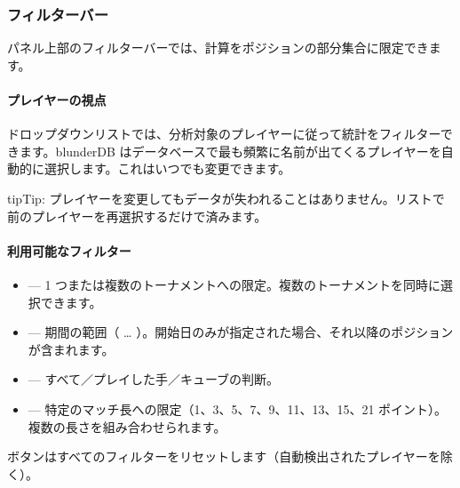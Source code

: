 \documentclass[letterpaper,10pt,dvipdfmx]{sphinxmanual}
\begin{document}
\subsubsection{フィルターバー}
\label{\detokenize{manuel:barre-de-filtre}}
\sphinxAtStartPar
パネル上部のフィルターバーでは、計算をポジションの部分集合に限定できます。


\paragraph{プレイヤーの視点}
\label{\detokenize{manuel:perspective-joueur}}
\sphinxAtStartPar
{} ドロップダウンリストでは、分析対象のプレイヤーに従って統計をフィルターできます。blunderDB はデータベースで最も頻繁に名前が出てくるプレイヤーを自動的に選択します。これはいつでも変更できます。

\begin{sphinxadmonition}{tip}{Tip:}
\sphinxAtStartPar
プレイヤーを変更してもデータが失われることはありません。リストで前のプレイヤーを再選択するだけで済みます。
\end{sphinxadmonition}


\paragraph{利用可能なフィルター}
\label{\detokenize{manuel:filtres-disponibles}}\begin{itemize}
\item {} 
\sphinxAtStartPar
{} — 1 つまたは複数のトーナメントへの限定。複数のトーナメントを同時に選択できます。

\item {} 
\sphinxAtStartPar
{} — 期間の範囲（ … ）。開始日のみが指定された場合、それ以降のポジションが含まれます。

\item {} 
\sphinxAtStartPar
{} — すべて／プレイした手／キューブの判断。

\item {} 
\sphinxAtStartPar
{} — 特定のマッチ長への限定（1、3、5、7、9、11、13、15、21 ポイント）。複数の長さを組み合わせられます。

\end{itemize}

\sphinxAtStartPar
{} ボタンはすべてのフィルターをリセットします（自動検出されたプレイヤーを除く）。
\end{document}
